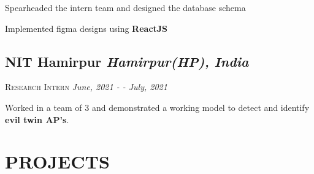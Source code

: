 \documentclass[10pt]{article}
\begin{document}
\begin{description}
\setlength{\itemindent}{2\parindent}
\setlength{\itemsep}{0em}
\item[$\bullet$]{Spearheaded the intern team and designed the database schema}
\item[$\bullet$]{Implemented figma designs using \textbf{ReactJS}}
\end{description}

\subsection*{NIT Hamirpur \hfill \normalsize \normalfont \textit{Hamirpur(HP), India}}
\vspace{-1ex}
\textsc{\textmd{Research Intern}} \hfill \normalsize \textit{June, 2021 - - July, 2021}
\vspace{-1ex}

\begin{description}
\setlength{\itemindent}{2\parindent}
\setlength{\itemsep}{0em}
\item[$\bullet$]{Worked in a team of 3 and demonstrated a working model to detect and identify \textbf{evil twin AP's}.}
\end{description}


\section{PROJECTS}

\end{document}
